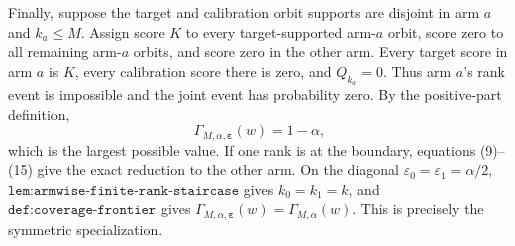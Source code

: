 Finally, suppose the target and calibration orbit supports are disjoint in arm \(a\) and \(k_a\le M\). Assign score \(K\) to every target-supported arm-\(a\) orbit, score zero to all remaining arm-\(a\) orbits, and score zero in the other arm. Every target score in arm \(a\) is \(K\), every calibration score there is zero, and \(Q_{k_a}=0\). Thus arm \(a\)'s rank event is impossible and the joint event has probability zero. By the positive-part definition,
\[
\Gamma_{M,\alpha,\boldsymbol\varepsilon}(w)=1-\alpha,
\tag{25}
\]
which is the largest possible value. If one rank is at the boundary, equations (9)--(15) give the exact reduction to the other arm. On the diagonal \(\varepsilon_0=\varepsilon_1=\alpha/2\), \(\texttt{lem:armwise-finite-rank-staircase}\) gives \(k_0=k_1=k\), and \(\texttt{def:coverage-frontier}\) gives \(\Gamma_{M,\alpha,\boldsymbol\varepsilon}(w)=\Gamma_{M,\alpha}(w)\). This is precisely the symmetric specialization.